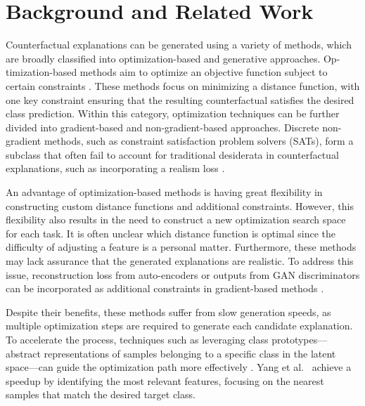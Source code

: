 \section{Background and Related Work}
Counterfactual explanations can be generated using a variety of methods, which are broadly classified into optimization-based and generative approaches. Op-timization-based methods aim to optimize an objective function subject to certain constraints \cite{poyiadzi2020face,ustun2019actionable,joshi2019towards,mothilal2020explaining,karimi2020model}. These methods focus on minimizing a distance function, with one key constraint ensuring that the resulting counterfactual satisfies the desired class prediction. Within this category, optimization techniques can be further divided into gradient-based and non-gradient-based approaches. Discrete non-gradient methods, such as constraint satisfaction problem solvers (SATs), form a subclass that often fail to account for traditional desiderata in counterfactual explanations, such as incorporating a realism loss \cite{barzekar2023achievable,rasouli2024care,salimi2023towards}.

 An advantage of optimization-based methods is having great flexibility in constructing custom distance functions and additional constraints. However, this flexibility also results in the need to construct a new optimization search space for each task. It is often unclear which distance function is optimal since the difficulty of adjusting a feature is a personal matter. Furthermore, these methods may lack assurance that the generated explanations are realistic. To address this issue, reconstruction loss from auto-encoders or outputs from GAN discriminators can be incorporated as additional constraints in gradient-based methods \cite{joshi2019towards,van2021interpretable}. 
 
 Despite their benefits, these methods suffer from slow generation speeds, as multiple optimization steps are required to generate each candidate explanation. To accelerate the process, techniques such as leveraging class prototypes—abstract representations of samples belonging to a specific class in the latent space—can guide the optimization path more effectively \cite{van2021interpretable}. Yang et al.~\cite{yang2022mace} achieve a speedup by identifying the most relevant features, focusing on the nearest samples that match the desired target class.

